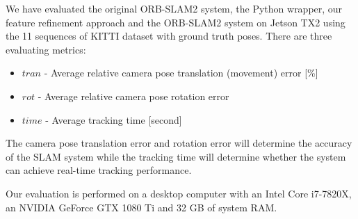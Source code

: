 \documentclass[letterpaper, 10 pt, conference]{IEEEtran}
\begin{document}
We have evaluated the original ORB-SLAM2 system, the Python wrapper, our feature
refinement approach and the ORB-SLAM2 system on Jetson TX2 using the 11
sequences of KITTI dataset \cite{c17} with ground truth poses. There are three
evaluating metrics: 
\begin{itemize}
    \item $tran$ - Average relative camera pose translation (movement) error
    [\%]
    \item $rot$ - Average relative camera pose rotation error \newline
    [degree/100m]
    \item $time$ - Average tracking time [second]
\end{itemize}
The camera pose translation error and rotation error will determine the accuracy
of the SLAM system while the tracking time will determine whether the system can
achieve real-time tracking performance. 

Our evaluation is performed on a desktop computer with an Intel Core i7-7820X,
an NVIDIA GeForce GTX 1080 Ti and 32 GB of system RAM.
\end{document}

